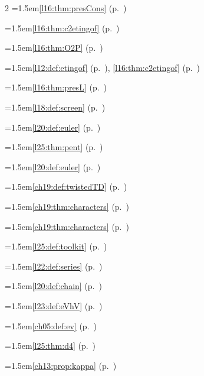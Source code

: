 \begin{multicols}{2}
\hangindent=1.5em\quad \ref{l16:thm:presCons} (p.~\pageref{l16:thm:presCons})\par
\hangindent=1.5em\quad \ref{l16:thm:c2etingof} (p.~\pageref{l16:thm:c2etingof})\par
\hangindent=1.5em\quad \ref{l16:thm:O2P} (p.~\pageref{l16:thm:O2P})\par
\hangindent=1.5em\quad \ref{l12:def:etingof} (p.~\pageref{l12:def:etingof}), \ref{l16:thm:c2etingof} (p.~\pageref{l16:thm:c2etingof})\par
\hangindent=1.5em\quad \ref{l16:thm:presL} (p.~\pageref{l16:thm:presL})\par
\hangindent=1.5em\quad \ref{l18:def:screen} (p.~\pageref{l18:def:screen})\par
\hangindent=1.5em\quad \ref{l20:def:euler} (p.~\pageref{l20:def:euler})\par
\hangindent=1.5em\quad \ref{l25:thm:pent} (p.~\pageref{l25:thm:pent})\par
\hangindent=1.5em\quad \ref{l20:def:euler} (p.~\pageref{l20:def:euler})\par
\hangindent=1.5em\quad \ref{ch19:def:twistedTD} (p.~\pageref{ch19:def:twistedTD})\par
\hangindent=1.5em\quad \ref{ch19:thm:characters} (p.~\pageref{ch19:thm:characters})\par
\hangindent=1.5em\quad \ref{ch19:thm:characters} (p.~\pageref{ch19:thm:characters})\par
\hangindent=1.5em\quad \ref{l25:def:toolkit} (p.~\pageref{l25:def:toolkit})\par
\hangindent=1.5em\quad \ref{l22:def:series} (p.~\pageref{l22:def:series})\par
\hangindent=1.5em\quad \ref{l20:def:chain} (p.~\pageref{l20:def:chain})\par
\hangindent=1.5em\quad \ref{l23:def:eVhV} (p.~\pageref{l23:def:eVhV})\par
\hangindent=1.5em\quad \ref{ch05:def:ev} (p.~\pageref{ch05:def:ev})\par
\hangindent=1.5em\quad \ref{l25:thm:d4} (p.~\pageref{l25:thm:d4})\par
\hangindent=1.5em\quad \ref{ch13:prop:kappa} (p.~\pageref{ch13:prop:kappa})\par

\end{multicols}
